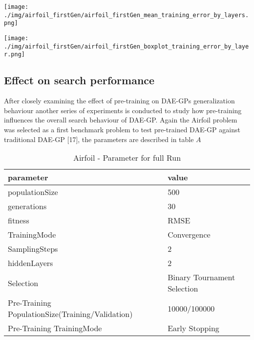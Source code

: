 \documentclass[
  11pt,
]{article}
\let\origfigure\figure
\let\endorigfigure\endfigure
\renewenvironment{figure}[1][2] {
    \expandafter\origfigure\expandafter[H]
} {
    \endorigfigure
}
\begin{document}
\begin{figure}
\centering
\texttt{[image: ./img/airfoil\_firstGen/airfoil\_firstGen\_mean\_training\_error\_by\_layers.png]}
\caption{First Generation Median Training Error for variable number of
hidden Layers - Airfoil}
\end{figure}

\begin{figure}
\centering
\texttt{[image: ./img/airfoil\_firstGen/airfoil\_firstGen\_boxplot\_training\_error\_by\_layer.png]}
\caption{First Generation final Training Error for variable number of
hidden Layers - Airfoil}
\end{figure}

\hypertarget{effect-on-search-performance}{%
\subsection{Effect on search
performance}\label{effect-on-search-performance}}

After closely examining the effect of pre-training on DAE-GPs
generalization behaviour another series of experiments is conducted to
study how pre-training influences the overall search behaviour of
DAE-GP. Again the Airfoil problem was selected as a first benchmark
problem to test pre-trained DAE-GP against traditional DAE-GP {[}17{]},
the parameters are described in table \(A\)

\begin{table}[!h]

\caption{\label{tab:airfoil_fullRun_2hl_maxIndSize_params}Airfoil - Parameter for full Run}
\centering
\begin{tabular}[t]{l|l}
\hline
\textbf{parameter} & \textbf{value}\\
\hline
populationSize & 500\\
\hline
generations & 30\\
\hline
fitness & RMSE\\
\hline
TrainingMode & Convergence\\
\hline
SamplingSteps & 2\\
\hline
hiddenLayers & 2\\
\hline
Selection & Binary Tournament Selection\\
\hline
Pre-Training PopulationSize(Training/Validation) & 10000/100000\\
\hline
Pre-Training TrainingMode & Early Stopping\\
\hline
\end{tabular}
\end{table}
\end{document}
